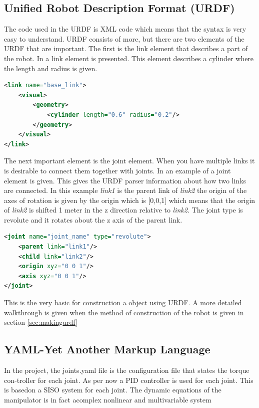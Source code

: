 \subsection{Unified Robot Description Format (URDF)}\label{sec:basicURDF}
The code used in the URDF is XML code which means that the syntax is very easy to understand. URDF consists of more, but there are two elements of the URDF that are important. The first is the link element that describes a part of the robot. In  a link element is presented. This element describes a cylinder where the length and radius is given. 


\begin{lstlisting}[language=xml,caption={Base},label={lst:example}]
<link name="base_link">
    <visual>
        <geometry>
            <cylinder length="0.6" radius="0.2"/>
        </geometry>
    </visual>
</link>
\end{lstlisting}
The next important element is the joint element. When you have multiple links it is desirable to connect them together with joints. In  an example of a joint element is given. This gives the URDF parser information about how two links are connected. In this example \textit{link1} is the parent link of \textit{link2} the origin of the axes of rotation is given by the origin which is [0,0,1] which means that the origin of \textit{link2} is shifted 1 meter in the z direction relative to \textit{link2}. The joint type is revolute and it rotates about the z axis of the parent link. 

\begin{lstlisting}[language=xml,caption={Base},label={lst:jointexample}]
<joint name="joint_name" type="revolute">
    <parent link="link1"/>
    <child link="link2"/>
    <origin xyz="0 0 1"/>
    <axis xyz="0 0 1"/>
</joint>
\end{lstlisting}
This is the very basic for construction a object using URDF. A more detailed walkthrough is given when the method of construction of the robot is given in section \ref{sec:makingurdf}


\subsection{YAML-Yet Another Markup Language}
In the project, the joints.yaml file is the configuration file that states the torque con-troller for each joint. As per now a PID controller is used for each joint. This is basedon a SISO system for each joint. The dynamic equations of the manipulator is in fact acomplex nonlinear and multivariable system

